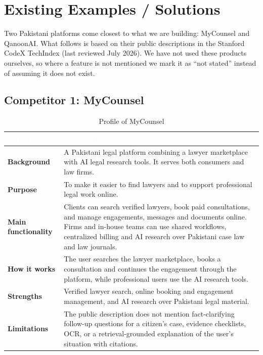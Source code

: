 \documentclass[12pt,a4paper]{report}
\newcommand{\thd}[1]{\textcolor{white}{\textbf{#1}}}
\newcommand{\headrow}{\rowcolor{tablehead}}
\begin{document}
\section{Existing Examples / Solutions}
Two Pakistani platforms come closest to what we are building: MyCounsel and QanoonAI. What follows is based on their public descriptions in the Stanford CodeX TechIndex (last reviewed July 2026). We have not used these products ourselves, so where a feature is not mentioned we mark it as ``not stated'' instead of assuming it does not exist.

\subsection*{Competitor 1: MyCounsel}
\begin{table}[H]
\centering
\caption{Profile of MyCounsel}
\label{tab:mycounsel}
\begin{tabular}{|L{3.4cm}|L{10.6cm}|}
\hline
\headrow \thd{Aspect} & \thd{Description} \\ \hline
\textbf{Background} & A Pakistani legal platform combining a lawyer marketplace with AI legal research tools. It serves both consumers and law firms. \\ \hline
{}\textbf{Purpose} & To make it easier to find lawyers and to support professional legal work online. \\ \hline
\textbf{Main functionality} & Clients can search verified lawyers, book paid consultations, and manage engagements, messages and documents online. Firms and in-house teams can use shared workflows, centralized billing and AI research over Pakistani case law and law journals. \\ \hline
{}\textbf{How it works} & The user searches the lawyer marketplace, books a consultation and continues the engagement through the platform, while professional users use the AI research tools. \\ \hline
\textbf{Strengths} & Verified lawyer search, online booking and engagement management, and AI research over Pakistani legal material. \\ \hline
{}\textbf{Limitations} & The public description does not mention fact-clarifying follow-up questions for a citizen's case, evidence checklists, OCR, or a retrieval-grounded explanation of the user's situation with citations. \\ \hline
\end{tabular}
\end{table}
\end{document}
